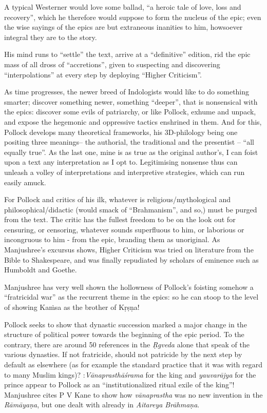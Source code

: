 A typical Westerner would love some ballad, ``a heroic tale of love, loss and recovery'', which he therefore would suppose to form the nucleus of the epic; even the wise sayings of the epics are but extraneous inanities to him, howsoever integral they are to the story.

His mind runs to “settle” the text, arrive at a “definitive” edition, rid the epic mass of all dross of  “accretions”, given to suspecting and discovering “interpolations” at every step by deploying “Higher Criticism”.

As time progresses, the newer breed of Indologists would like to do something smarter; discover something newer, something “deeper”, that is nonsensical with the epics: discover some evils of patriarchy, or like Pollock, exhume and unpack, and expose the hegemonic and oppressive tactics enshrined in them. And for this, Pollock develops many theoretical frameworks, his 3D-philology being one positing three meanings-- the authorial, the traditional and the presentist -- “all equally true”. As the last one, mine is as true as the original author's, I can foist upon a text any interpretation as I opt to. Legitimising nonsense thus can unleash a volley of interpretations and interpretive strategies, which can run easily amuck.

For Pollock and critics of his ilk, whatever is religious/mythological and philosophical/didactic (would smack of “Brahmanism”, and so,) must be purged from the text. The critic has the fullest freedom to be on the look out for censuring, or censoring, whatever sounds superfluous to him, or laborious or incongruous to him - from the epic, branding them as unoriginal. As Manjushree's excursus shows, Higher Criticism was tried on literature from the Bible to Shakespeare, and was finally repudiated by scholars of eminence such as Humboldt and Goethe.

Manjushree has very well shown the hollowness of Pollock's foisting somehow a “fratricidal war” as the recurrent theme in the epics: so he can stoop to the level of showing Kaṁsa as the brother of Kṛṣṇa!

Pollock seeks to show that dynastic succession marked a major change in the structure of political power towards the beginning of the epic period. To the contrary, there are around 50 references in the {\sl Ṛgveda} alone that speak of the various dynasties. If not fratricide, should not patricide by the next step by default as elsewhere (as for example the standard practice that it was with regard to many Muslim kings)? :{\sl Vānaprasthāśrama} for the king and {\sl yauvarājya} for the prince appear to Pollock as an “institutionalized ritual exile of the king”! Manjushree cites P V Kane to show how {\sl vānaprastha} was no new invention in the {\sl Rāmāyaṇa}, but one dealt with already in {\sl Aitareya Brāhmaṇa}.

